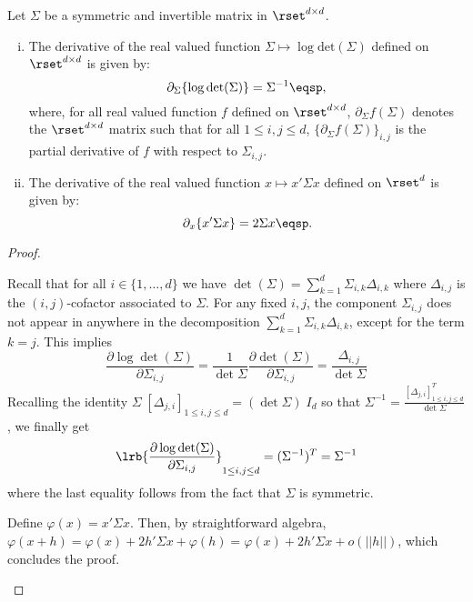 \begin{lemma}
\label{lem:matrix:calculus}
Let $\Sigma$ be a symmetric and invertible  matrix in $\rset^{d\times d}$.
\begin{enumerate}[(i)]
\item The derivative of the real valued function $\Sigma \mapsto \log\mathrm{det}(\Sigma)$ defined on $\rset^{d\times d}$ is given by:
\[
\partial_{\Sigma}\{\log\mathrm{det}(\Sigma)\}= \Sigma^{-1}\eqsp,
\]
where, for all real valued function $f$ defined on $\rset^{d\times d}$, $\partial_{\Sigma}f(\Sigma)$ denotes the $\rset^{d\times d}$ matrix such that for all $1\leqslant i,j\leqslant d$, $\{\partial_{\Sigma}f(\Sigma)\}_{i,j}$ is the partial derivative of $f$ with respect to $\Sigma_{i,j}$.
\item The derivative of the real valued  function  $x\mapsto x'\Sigma x$ defined on $\rset^d$ is given by:
\[
\partial_{x}\{x'\Sigma x\} = 2 \Sigma x\eqsp.
\]
\end{enumerate}
\end{lemma}
\begin{proof}
  \begin{enumerateList}
    \item Recall that for all $i \in \{1,\ldots,d\}$ we have
      $\det(\Sigma)=\sum_{k=1}^d \Sigma_{i,k} \Delta_{i,k}$ where
      $\Delta_{i,j}$ is the $(i,j)$-cofactor associated to
      $\Sigma$. For any fixed $i,j$, the component $\Sigma_{i,j}$ does not appear in anywhere in
      the decomposition $\sum_{k=1}^d \Sigma_{i,k} \Delta_{i,k}$,
      except for the term $k=j$. This implies
      $$
      \frac{\partial \log \det(\Sigma)}{\partial \Sigma_{i,j}}=
      \frac{1}{\det \Sigma}\frac{\partial  \det(\Sigma)}{\partial
        \Sigma_{i,j}}=\frac{\Delta_{i,j}}{\det  \Sigma}
      $$
      Recalling the identity $\Sigma\; [\Delta_{j,i}]_{1\leq i,j \leq d}=(\det
      \Sigma)\; I_d$ so that $\Sigma^{-1}=\frac{[\Delta_{j,i}]_{1\leq i,j \leq d}^T}{\det
      \Sigma}$, we finally get
      $$
\lrb{\frac{\partial \log \det(\Sigma)}{\partial \Sigma_{i,j}}}_{1\leq
  i,j  \leq d}=(\Sigma^{-1})^T=\Sigma^{-1}
$$
where the last equality follows from the fact that $\Sigma$ is
symmetric.
\item Define $\varphi(x)=x'\Sigma x$. Then, by straightforward
  algebra, $\varphi(x+h)=\varphi(x)+2h'\Sigma
  x+\varphi(h)=\varphi(x)+2h'\Sigma x+o(||h||)$, which concludes the
  proof.
  \end{enumerateList}
\end{proof}
